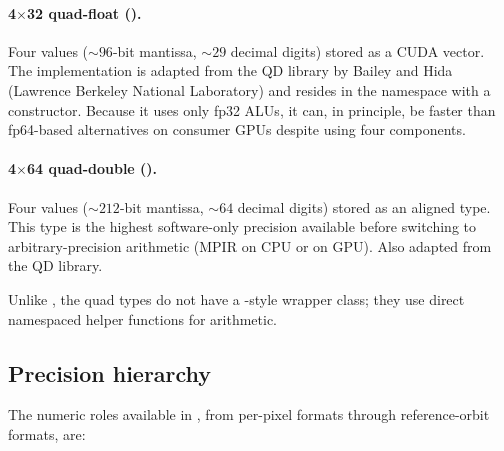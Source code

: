 \paragraph{4\texorpdfstring{$\times$}{x}32 quad-float ().}
Four  values (${\sim}96$-bit mantissa, ${\sim}29$ decimal digits)
stored as a CUDA  vector.  The implementation is adapted from the
QD library by Bailey and Hida \cite{Hida2001QD} (Lawrence Berkeley National Laboratory) and
resides in the  namespace with a  constructor.
Because it uses only fp32 ALUs, it can, in principle, be faster than fp64-based alternatives
on consumer GPUs despite using four components.

\paragraph{4\texorpdfstring{$\times$}{x}64 quad-double ().}
Four  values (${\sim}212$-bit mantissa, ${\sim}64$ decimal
digits) stored as an aligned  type.  This type is the highest
software-only precision available before switching to arbitrary-precision
arithmetic (MPIR \cite{MPIR_Library} on CPU or  on GPU).  Also adapted from
the QD library.

Unlike , the quad types do not have a -style
wrapper class; they use direct namespaced helper functions for arithmetic.

\subsection{Precision hierarchy}
\label{subsec:ep-hierarchy}

The numeric roles available in \FractalShark{}, from per-pixel formats through
reference-orbit formats, are:

